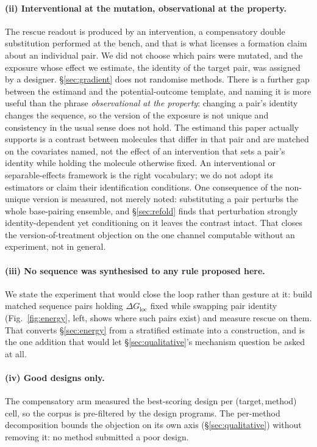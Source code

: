 \documentclass[11pt]{article}
\begin{document}
\paragraph{(ii) Interventional at the mutation, observational at the property.} The rescue readout is produced by an intervention, a compensatory double substitution
performed at the bench, and that is what licenses a formation claim about an individual pair.
We did not choose which pairs were mutated, and the exposure whose effect we estimate, the identity
of the target pair, was assigned by a designer. \S\ref{sec:gradient} does not randomise methods.
There is a further gap between the estimand and the potential-outcome template, and naming it is
more useful than the phrase \emph{observational at the property}: changing a pair's identity changes
the sequence, so the version of the exposure is not unique and consistency in the usual sense does
not hold. The estimand this paper actually supports is a contrast between molecules that differ in
that pair and are matched on the covariates named, not the effect of an intervention that sets a
pair's identity while holding the molecule otherwise fixed. An interventional or separable-effects framework
\citep{vanderweele2015explanation} is the right vocabulary; we do not adopt its estimators or claim
their identification conditions. One consequence of the non-unique version is measured, not merely
noted: substituting a pair perturbs the whole base-pairing ensemble, and \S\ref{sec:refold} finds
that perturbation strongly identity-dependent yet conditioning on it leaves the contrast intact.
That closes the version-of-treatment objection on the one channel computable without an
experiment, not in general.

\paragraph{(iii) No sequence was synthesised to any rule proposed here.} We state the experiment
that would close the loop rather than gesture at it: build matched sequence pairs holding
$\Delta G_{\mathrm{loc}}$ fixed while swapping pair identity (Fig.~\ref{fig:energy}, left, shows
where such pairs exist) and measure rescue on them. That converts \S\ref{sec:energy} from a
stratified estimate into a construction, and is the one addition that would let
\S\ref{sec:qualitative}'s mechanism question be asked at all. 
\paragraph{(iv) Good designs only.} The compensatory arm measured the best-scoring design per
(target,\,method) cell, so the corpus is pre-filtered by the design programs. The per-method decomposition bounds the objection on its own axis (\S\ref{sec:qualitative}) without
removing it: no method submitted a poor design. 
\end{document}
